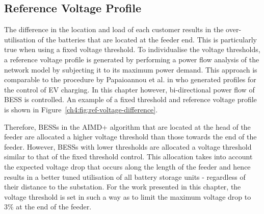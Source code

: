 \subsection{Reference Voltage Profile}

The difference in the location and load of each customer results in the over-utilisation of the batteries that are located at the feeder end.
This is particularly true when using a fixed voltage threshold.
To individualise the voltage thresholds, a reference voltage profile is generated by performing a power flow analysis of the network model by subjecting it to its maximum power demand.
This approach is comparable to the procedure by Papaioannou et al. in \cite{Papaioannou2015} who generated profiles for the control of EV charging.
In this chapter however, bi-directional power flow of BESS is controlled.
An example of a fixed threshold and reference voltage profile is shown in Figure~\ref{ch4:fig:ref-voltage-difference}.



Therefore, BESSs in the AIMD+ algorithm that are located at the head of the feeder are allocated a higher voltage threshold than those towards the end of the feeder.
However, BESSs with lower thresholds are allocated a voltage threshold similar to that of the fixed threshold control.
This allocation takes into account the expected voltage drop that occurs along the length of the feeder and hence results in a better tuned utilisation of all battery storage units - regardless of their distance to the substation.
For the work presented in this chapter, the voltage threshold is set in such a way as to limit the maximum voltage drop to 3\% at the end of the feeder.
